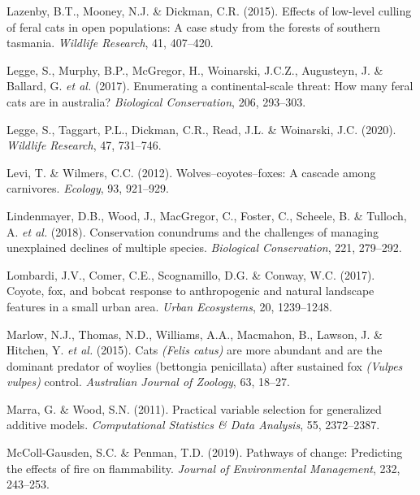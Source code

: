 \documentclass[11pt,a4paper,titlepage,twoside,openright]{style/unimelbthesis}
\begin{document}
\begin{mainmatter}
\leavevmode\hypertarget{ref-lazenby2015effects}{}%
Lazenby, B.T., Mooney, N.J. \& Dickman, C.R. (2015). Effects of low-level culling of feral cats in open populations: A case study from the forests of southern tasmania. \emph{Wildlife Research}, 41, 407--420.

\leavevmode\hypertarget{ref-legge2017enumerating}{}%
Legge, S., Murphy, B.P., McGregor, H., Woinarski, J.C.Z., Augusteyn, J. \& Ballard, G. \emph{et al.} (2017). Enumerating a continental-scale threat: How many feral cats are in australia? \emph{Biological Conservation}, 206, 293--303.

\leavevmode\hypertarget{ref-legge2020cat}{}%
Legge, S., Taggart, P.L., Dickman, C.R., Read, J.L. \& Woinarski, J.C. (2020). \emph{Wildlife Research}, 47, 731--746.

\leavevmode\hypertarget{ref-levi2012wolves}{}%
Levi, T. \& Wilmers, C.C. (2012). Wolves--coyotes--foxes: A cascade among carnivores. \emph{Ecology}, 93, 921--929.

\leavevmode\hypertarget{ref-lindenmayer2018conservation}{}%
Lindenmayer, D.B., Wood, J., MacGregor, C., Foster, C., Scheele, B. \& Tulloch, A. \emph{et al.} (2018). Conservation conundrums and the challenges of managing unexplained declines of multiple species. \emph{Biological Conservation}, 221, 279--292.

\leavevmode\hypertarget{ref-lombardi2017coyote}{}%
Lombardi, J.V., Comer, C.E., Scognamillo, D.G. \& Conway, W.C. (2017). Coyote, fox, and bobcat response to anthropogenic and natural landscape features in a small urban area. \emph{Urban Ecosystems}, 20, 1239--1248.

\leavevmode\hypertarget{ref-marlow2015cats}{}%
Marlow, N.J., Thomas, N.D., Williams, A.A., Macmahon, B., Lawson, J. \& Hitchen, Y. \emph{et al.} (2015). Cats \emph{(Felis catus)} are more abundant and are the dominant predator of woylies (bettongia penicillata) after sustained fox \emph{(Vulpes vulpes)} control. \emph{Australian Journal of Zoology}, 63, 18--27.

\leavevmode\hypertarget{ref-marra2011practical}{}%
Marra, G. \& Wood, S.N. (2011). Practical variable selection for generalized additive models. \emph{Computational Statistics \& Data Analysis}, 55, 2372--2387.

\leavevmode\hypertarget{ref-MCCOLLGAUSDEN2019243}{}%
McColl-Gausden, S.C. \& Penman, T.D. (2019). Pathways of change: Predicting the effects of fire on flammability. \emph{Journal of Environmental Management}, 232, 243--253.


\end{mainmatter}
\end{document}
